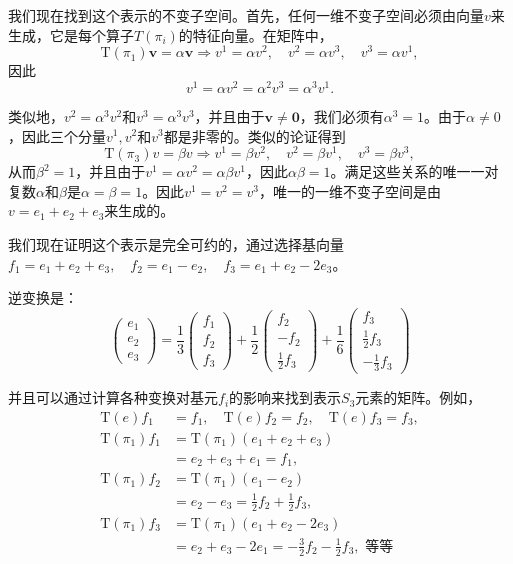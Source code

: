 \documentclass[hyperref,UTF8]{ctexbook}
\begin{document}
我们现在找到这个表示的不变子空间。首先，任何一维不变子空间必须由向量$v$来生成，它是每个算子$T\left(\pi_i\right)$的特征向量。在矩阵中，
$$
\mathrm{T}\left(\pi_1\right) \mathbf{v}=\alpha \mathbf{v} \Longrightarrow v^1=\alpha v^2, \quad v^2=\alpha v^3, \quad v^3=\alpha v^1,
$$
因此
$$
v^1=\alpha v^2=\alpha^2 v^3=\alpha^3 v^1 .
$$

类似地，$v^2=\alpha^3 v^2$和$v^3=\alpha^3 v^3$，并且由于$\mathbf{v} \neq \mathbf{0}$，我们必须有$\alpha^3=1$。由于$\alpha \neq 0$，因此三个分量$v^1, v^2$和$v^3$都是非零的。类似的论证得到
$$
\mathrm{T}\left(\pi_3\right) v=\beta v \Longrightarrow v^1=\beta v^2, \quad v^2=\beta v^1, \quad v^3=\beta v^3,
$$
从而$\beta^2=1$，并且由于$v^1=\alpha v^2=\alpha \beta v^1$，因此$\alpha \beta=1$。满足这些关系的唯一一对复数$\alpha$和$\beta$是$\alpha=\beta=1$。因此$v^1=v^2=v^3$，唯一的一维不变子空间是由$v=e_1+e_2+e_3$来生成的。

我们现在证明这个表示是完全可约的，通过选择基向量$f_1=e_1+e_2+e_3, \quad f_2=e_1-e_2, \quad f_3=e_1+e_2-2 e_3$。

逆变换是：
$$
\begin{pmatrix}
e_1 \\
e_2 \\
e_3
\end{pmatrix}
=
\frac{1}{3}\begin{pmatrix}
f_1 \\
f_2 \\
f_3
\end{pmatrix}
+
\frac{1}{2}\begin{pmatrix}
f_2 \\
-f_2 \\
\frac{1}{2}f_3
\end{pmatrix}
+
\frac{1}{6}\begin{pmatrix}
f_3 \\
\frac{1}{2}f_3 \\
-\frac{1}{3}f_3
\end{pmatrix}
$$

并且可以通过计算各种变换对基元$f_i$的影响来找到表示$S_3$元素的矩阵。例如，
$$
\begin{aligned}
\mathrm{T}(e) f_1 &= f_1, \quad \mathrm{T}(e) f_2 = f_2, \quad \mathrm{T}(e) f_3 = f_3, \\
\mathrm{T}\left(\pi_1\right) f_1 &= \mathrm{T}\left(\pi_1\right)\left(e_1+e_2+e_3\right) \\
&= e_2+e_3+e_1=f_1, \\
\mathrm{T}\left(\pi_1\right) f_2 &= \mathrm{T}\left(\pi_1\right)\left(e_1-e_2\right) \\
&= e_2-e_3=\frac{1}{2} f_2+\frac{1}{2} f_3, \\
\mathrm{T}\left(\pi_1\right) f_3 &= \mathrm{T}\left(\pi_1\right)\left(e_1+e_2-2 e_3\right) \\
&= e_2+e_3-2 e_1=-\frac{3}{2} f_2-\frac{1}{2} f_3, \text { 等等 }
\end{aligned}$$
\end{document}
